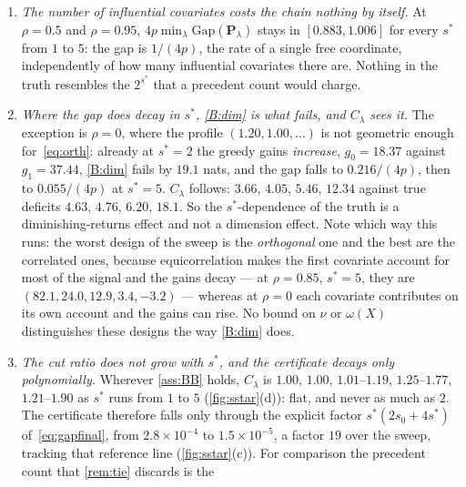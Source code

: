 \documentclass[aos]{imsart}
\theoremstyle{plain}
\theoremstyle{definition}
\begin{document}
    \begin{enumerate}[label=(\roman*),leftmargin=2.6em]
        \item \emph{The number of influential covariates costs the chain
        nothing by itself.} At $\rho=0.5$ and $\rho=0.95$,
        $4p\min_\lambda\mathrm{Gap}(\mathbf{P}_\lambda)$ stays in
        $[0.883,1.006]$ for every $s^{\ast}$ from $1$ to $5$: the gap is
        $1/(4p)$, the rate of a single free coordinate, independently of how
        many influential covariates there are. Nothing in the truth resembles
        the $2^{s^{\ast}}$ that a precedent count would charge.
        \item \emph{Where the gap does decay in $s^{\ast}$, \ref{B:dim} is
        what fails, and $C_\lambda$ sees it.} The exception is $\rho=0$,
        where the profile $(1.20,1.00,\dots)$ is not geometric enough
        for~\eqref{eq:orth}: already at $s^{\ast}=2$ the greedy gains
        \emph{increase}, $g_0=18.37$ against $g_1=37.44$, \ref{B:dim} fails
        by $19.1$ nats, and the gap falls to $0.216/(4p)$, then to
        $0.055/(4p)$ at $s^{\ast}=5$. $C_\lambda$ follows: $3.66$, $4.05$,
        $5.46$, $12.34$ against true deficits $4.63$, $4.76$, $6.20$,
        $18.1$. So the $s^{\ast}$-dependence of the truth is a
        diminishing-returns effect and not a dimension effect. Note which
        way this runs: the worst design of the sweep is the
        \emph{orthogonal} one and the best are the correlated ones, because
        equicorrelation makes the first covariate account for most of the
        signal and the gains decay --- at $\rho=0.85$, $s^{\ast}=5$, they
        are $(82.1,24.0,12.9,3.4,-3.2)$ --- whereas at $\rho=0$ each
        covariate contributes on its own account and the gains can rise. No
        bound on $\nu$ or $\omega(X)$ distinguishes these designs the way
        \ref{B:dim} does.
        \item \emph{The cut ratio does not grow with $s^{\ast}$, and the
        certificate decays only polynomially.} Wherever \cref{ass:BB} holds,
        $C_\lambda$ is $1.00$, $1.00$, $1.01$--$1.19$, $1.25$--$1.77$,
        $1.21$--$1.90$ as $s^{\ast}$ runs from $1$ to $5$
        (\cref{fig:sstar}(d)): flat, and never as much as $2$. The
        certificate therefore falls only through the explicit factor
        $s^{\ast}(2s_0+4s^{\ast})$ of~\eqref{eq:gapfinal}, from
        $2.8\times10^{-4}$ to $1.5\times10^{-5}$, a factor $19$ over the
        sweep, tracking that reference line (\cref{fig:sstar}(c)). For
        comparison the precedent count that \cref{rem:tie} discards is the

\end{enumerate}
\end{document}
